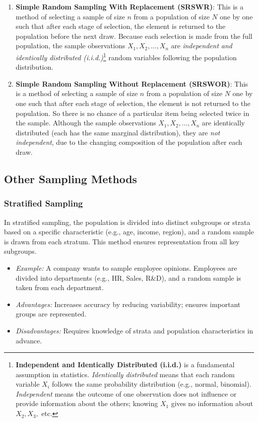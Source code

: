 \documentclass[twoside]{book}
\begin{document}
\begin{enumerate}
    \item \textbf{Simple Random Sampling With Replacement (SRSWR)}: This is a method of selecting a sample of size \( n \) from a population of size \( N \) one by one such that after each stage of selection, the element is returned to the population before the next draw. Because each selection is made from the full population, the sample observations \( X_1, X_2, \dots, X_n \) are \textit{independent and identically distributed (i.i.d.)}\footnote{%
    \textbf{Independent and Identically Distributed (i.i.d.)} is a fundamental assumption in statistics. \textit{Identically distributed} means that each random variable \( X_i \) follows the same probability distribution (e.g., normal, binomial). \textit{Independent} means the outcome of one observation does not influence or provide information about the others; knowing \( X_1 \) gives no information about \( X_2, X_3, \) etc.
} random variables following the population distribution.

    \item \textbf{Simple Random Sampling Without Replacement (SRSWOR)}: This is a method of selecting a sample of size \( n \) from a population of size \( N \) one by one such that after each stage of selection, the element is not returned to the population. So there is no chance of a particular item being selected twice in the sample. Although the sample observations \( X_1, X_2, \dots, X_n \) are identically distributed (each has the same marginal distribution), they are \textit{not independent}, due to the changing composition of the population after each draw.
\end{enumerate}


\subsection{Other Sampling Methods}


\subsubsection{Stratified Sampling}
In stratified sampling, the population is divided into distinct subgroups or strata based on a specific characteristic (e.g., age, income, region), and a random sample is drawn from each stratum. This method ensures representation from all key subgroups.

\begin{itemize}
\item \textit{Example:} A company wants to sample employee opinions. Employees are divided into departments (e.g., HR, Sales, R\&D), and a random sample is taken from each department.

\item \textit{Advantages:} Increases accuracy by reducing variability; ensures important groups are represented.

\item \textit{Disadvantages:} Requires knowledge of strata and population characteristics in advance.
\end{itemize}
\end{document}
